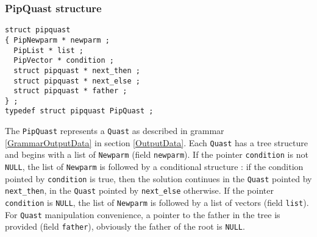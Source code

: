 \documentclass[12pt,a4paper,dvips]{article}
\begin{document}
\subsubsection{PipQuast structure}
\begin{verbatim}
struct pipquast
{ PipNewparm * newparm ;
  PipList * list ;
  PipVector * condition ;
  struct pipquast * next_then ;
  struct pipquast * next_else ;
  struct pipquast * father ;
} ;      
typedef struct pipquast PipQuast ;
\end{verbatim}
The {\tt PipQuast} represents a {\tt Quast} as described in
grammar \ref{GrammarOutputData} in section \ref{OutputData}. Each {\tt Quast}
has a tree structure and begins with a list of {\tt Newparm}
(field {\tt newparm}). If the pointer {\tt condition} is not {\tt NULL}, the
list of {\tt Newparm} is followed by a conditional structure : if the condition
pointed by {\tt condition} is true, then the solution continues in the
{\tt Quast} pointed by {\tt next\_then}, in the {\tt Quast} pointed by
{\tt next\_else} otherwise. If the pointer {\tt condition} is {\tt NULL}, the
list of {\tt Newparm} is followed by a list of vectors (field {\tt list}).
For {\tt Quast} manipulation convenience, a pointer to the father in the tree
is provided (field {\tt father}), obviously the father of the root is {\tt NULL}. 
\end{document}
